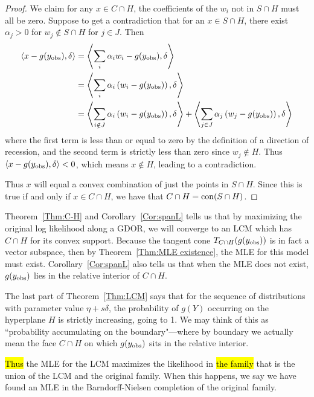 \begin{proof}
We claim for any $x \in C \cap H$, the coefficients of the $w_i$ not in $S \cap H$ must all be zero.  Suppose to get a contradiction that for an $x \in S \cap H$, there exist $\alpha_j > 0$ for $w_j \notin S \cap H$ for $j \in J$.  Then
\begin{align*}
	\langle x - g(y_{\text{obs}}), \delta  \rangle &= \left \langle  \sum_i \alpha_i w_i - g(y_{\text{obs}}), \delta \right  \rangle \\
	&= \left \langle  \sum_i \alpha_i \left( w_i - g(y_{\text{obs}}) \right), \delta \right  \rangle\\
	&=  \left \langle  \sum_{i \notin J} \alpha_i \left( w_i - g(y_{\text{obs}}) \right), \delta \right  \rangle
		+ \left \langle  \sum_{j\in J} \alpha_j \left( w_j - g(y_{\text{obs}}) \right), \delta \right  \rangle
\end{align*}
where the first term is less than or equal to zero by the definition of a direction of
recession, and the second term is strictly less than zero since $w_j \notin H$.  Thus 
$\langle x - g(y_{\text{obs}}), \delta  \rangle < 0$, which means $x \notin H$, leading to a contradiction.

Thus $x$ will equal a convex combination of just the points in $S \cap H$.  Since this is 
true if and only if $x \in C \cap H$, we have that $C \cap H = \operatorname{con}( S\cap H)$.
\end{proof}



Theorem~\ref{Thm:C-H} and Corollary~\ref{Cor:spanL} tells us that by maximizing the 
original log likelihood along a GDOR, we will converge to an LCM which has $C \cap H$ for
its convex support.  Because the tangent cone $T_{C \cap H} (g(y_{\text{obs}}))$ 
is in fact a vector subspace, then by Theorem~\ref{Thm:MLE existence}, the MLE for 
this model must exist.  Corollary~\ref{Cor:spanL} also tells us that when the MLE
does not exist, $g(y_{\text{obs}})$ lies in the relative interior of $C \cap H$.

The last part of Theorem~\ref{Thm:LCM} says that for the sequence of distributions with parameter 
value $\eta+s\delta$, the probability of $g(Y)$ occurring on the hyperplane $H$ is strictly 
increasing, going to 1.  We may think of this as 
``probability accumulating on the boundary"---where by boundary 
we  actually mean the face $C \cap H$ on which $g(y_{\text{obs}})$ sits in the relative interior.

\hl{Thus} the MLE for the LCM maximizes the likelihood in \hl{the family} that is the 
union of the LCM and the original family.  When 
this happens, we say we have found an MLE in the Barndorff-Nielsen completion of the 
original family.



